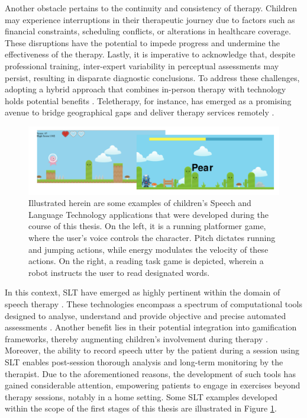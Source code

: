Another obstacle pertains to the continuity and consistency of therapy. Children may experience interruptions in their therapeutic journey due to factors such as financial constraints, scheduling conflicts, or alterations in healthcare coverage. These disruptions have the potential to impede progress and undermine the effectiveness of the therapy. Lastly, it is imperative to acknowledge that, despite professional training, inter-expert variability in perceptual assessments may persist, resulting in disparate diagnostic conclusions. To address these challenges, adopting a hybrid approach that combines in-person therapy with technology holds potential benefits \cite{hilty2015new,barnett2011utilizing}. Teletherapy, for instance, has emerged as a promising avenue to bridge geographical gaps and deliver therapy services remotely \cite{hughes2019increasing}.

\begin{figure}[h]
    \centering
    \includegraphics[width=1\textwidth]{imgs/exampleSLT.png}
    \caption{Illustrated herein are some examples of children's Speech and Language Technology applications that were developed during the course of this thesis. On the left, it is a running platformer game, where the user's voice controls the character. Pitch dictates running and jumping actions, while energy modulates the velocity of these actions. On the right, a reading task game is depicted, wherein a robot instructs the user to read designated words.}
    \label{fig:exSLT}

\end{figure}

In this context, \ac{SLT} have emerged as highly pertinent within the domain of speech therapy \cite{mendoza2022added}. These technologies encompass a spectrum of computational tools designed to analyse, understand and provide objective and precise automated assessments \cite{SAZ2009948}. Another benefit lies in their potential integration into gamification frameworks, thereby augmenting children's involvement during therapy \cite{brewer2013using,liu2015gamification}. Moreover, the ability to record speech utter by the patient during a session using \ac{SLT} enables post-session thorough analysis and long-term monitoring by the therapist. Due to the aforementioned reasons, the development of such tools has gained considerable attention, empowering patients to engage in exercises beyond therapy sessions, notably in a home setting. Some \ac{SLT} examples developed within the scope of the first stages of this thesis are illustrated in Figure \ref{fig:exSLT}.

